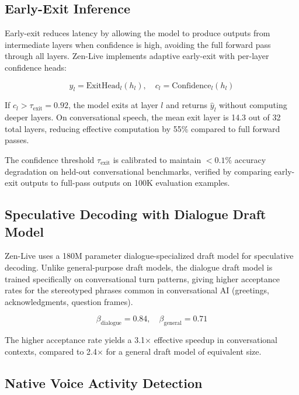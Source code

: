 \documentclass[11pt,a4paper]{article}
\begin{document}
\subsection{Early-Exit Inference}

Early-exit \cite{earlyexit} reduces latency by allowing the model to produce outputs from intermediate layers when confidence is high, avoiding the full forward pass through all layers. Zen-Live implements adaptive early-exit with per-layer confidence heads:

\begin{equation}
  \hat{y}_l = \text{ExitHead}_l(h_l), \quad c_l = \text{Confidence}_l(h_l)
\end{equation}

If $c_l > \tau_{\text{exit}} = 0.92$, the model exits at layer $l$ and returns $\hat{y}_l$ without computing deeper layers. On conversational speech, the mean exit layer is 14.3 out of 32 total layers, reducing effective computation by 55\% compared to full forward passes.

The confidence threshold $\tau_{\text{exit}}$ is calibrated to maintain $<0.1\%$ accuracy degradation on held-out conversational benchmarks, verified by comparing early-exit outputs to full-pass outputs on 100K evaluation examples.

\subsection{Speculative Decoding with Dialogue Draft Model}

Zen-Live uses a 180M parameter dialogue-specialized draft model for speculative decoding. Unlike general-purpose draft models, the dialogue draft model is trained specifically on conversational turn patterns, giving higher acceptance rates for the stereotyped phrases common in conversational AI (greetings, acknowledgments, question frames).

\begin{equation}
  \beta_{\text{dialogue}} = 0.84, \quad \beta_{\text{general}} = 0.71
\end{equation}

The higher acceptance rate yields a 3.1$\times$ effective speedup in conversational contexts, compared to 2.4$\times$ for a general draft model of equivalent size.

\subsection{Native Voice Activity Detection}
\end{document}
